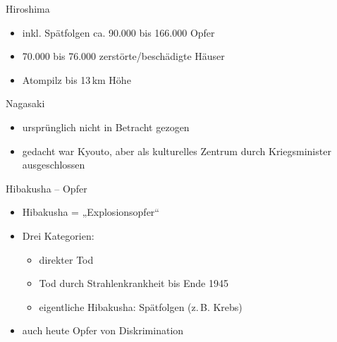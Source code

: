 \begin{frame}{Hiroshima}
	\begin{itemize}
		\item inkl. Spätfolgen ca. 90.000 bis 166.000 Opfer
		\pause
		\item 70.000 bis 76.000 zerstörte/beschädigte Häuser
		\pause
		\item Atompilz bis 13\,km Höhe
	\end{itemize}
\end{frame}

\begin{frame}{Nagasaki}
	\begin{itemize}
		\item ursprünglich nicht in Betracht gezogen
		\item gedacht war Kyouto, aber als kulturelles Zentrum durch
			Kriegsminister 	ausgeschlossen
	\end{itemize}
\end{frame}

\begin{frame}{Hibakusha -- Opfer}
	\begin{itemize}
		\item Hibakusha = „Explosionsopfer“
		\pause
		\item Drei Kategorien:
			\pause \begin{itemize}
			\item direkter Tod
			\pause
			\item Tod durch Strahlenkrankheit bis Ende 1945
			\pause
			\item eigentliche Hibakusha: Spätfolgen (z.\,B. Krebs)
			\pause
		\end{itemize}
		\item auch heute Opfer von Diskrimination
	\end{itemize}
\end{frame}


